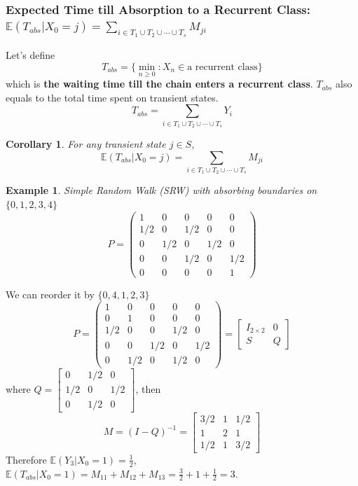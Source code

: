 \documentclass[11pt,a4paper]{article}
\newtheorem{example}{Example}
\newtheorem{corollary}{Corollary}
\begin{document}
\subsubsection{Expected Time till Absorption to a Recurrent Class: $\mathbb{E}(T_{abs}|X_0=j)=\sum_{i\in T_1\cup T_2\cup\cdots\cup T_s} M_{ji}$}
Let's define $$T_{abs}=\{\min_{n\geq 0}: X_n\in \text{a recurrent class}\}$$
which is \textbf{the waiting time till the chain enters a recurrent class}.
$T_{abs}$ also equals to the total time spent on transient states. $$T_{abs}=\sum_{i\in T_1\cup T_2\cup\cdots\cup T_s}Y_i$$
\begin{corollary}
    For any transient state $j\in S$, $$\mathbb{E}(T_{abs}|X_0=j)=\sum_{i\in T_1\cup T_2\cup\cdots\cup T_s} M_{ji}$$
\end{corollary}
\begin{example}
    Simple Random Walk (SRW) with absorbing boundaries on $\{0,1,2,3,4\}$
    $$P=\left(\begin{array}{ccccc}
    1 & 0 & 0 & 0 & 0 \\
    1 / 2 & 0 & 1 / 2 & 0 & 0 \\
    0 & 1 / 2 & 0 & 1 / 2 & 0 \\
    0 & 0 & 1 / 2 & 0 & 1 / 2 \\
    0 & 0 & 0 & 0 & 1
    \end{array}\right)$$
\end{example}
We can reorder it by $\{0,4,1,2,3\}$
$$P=\left(\begin{array}{ccccc}
    1 & 0 & 0 & 0 & 0 \\
    0 & 1 & 0 & 0 & 0 \\
    1 / 2 & 0 & 0 & 1 / 2 & 0 \\
    0 & 0 & 1 / 2 & 0 & 1 / 2 \\
    0 & 1 / 2 & 0& 1 / 2 & 0
    \end{array}\right)=\begin{bmatrix}
        I_{2\times 2}&	0\\
        S	& Q
    \end{bmatrix}$$
where $Q=\begin{bmatrix}
    0 & 1 / 2 & 0 \\
    1 / 2 & 0 & 1 / 2 \\
    0& 1 / 2 & 0
\end{bmatrix}$, then $$M=(I-Q)^{-1}=\begin{bmatrix}
    3/2 & 1 & 1/2 \\
    1 & 2 & 1 \\
    1/2& 1 & 3/2
\end{bmatrix}$$
Therefore $\mathbb{E}(Y_3|X_0=1)=\frac{1}{2}$, $\mathbb{E}(T_{abs}|X_0=1)=M_{11}+M_{12}+M_{13}=\frac{3}{2}+1+\frac{1}{2}=3$.
\end{document}
